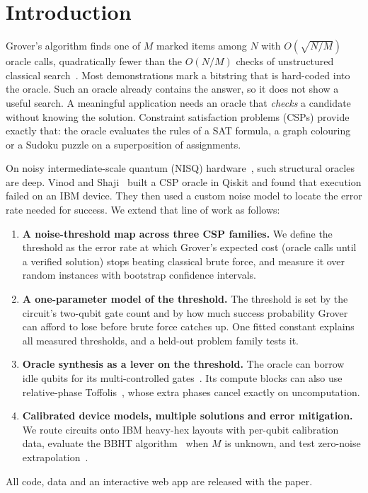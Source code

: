 \documentclass[conference]{IEEEtran}
\begin{document}
\section{Introduction}

Grover's algorithm finds one of $M$ marked items among $N$ with $O(\sqrt{N/M})$ oracle calls, quadratically fewer than the $O(N/M)$ checks of unstructured classical search~\cite{grover1996,bbht1998}. Most demonstrations mark a bitstring that is hard-coded into the oracle. Such an oracle already contains the answer, so it does not show a useful search. A meaningful application needs an oracle that \emph{checks} a candidate without knowing the solution. Constraint satisfaction problems (CSPs) provide exactly that: the oracle evaluates the rules of a SAT formula, a graph colouring or a Sudoku puzzle on a superposition of assignments.

On noisy intermediate-scale quantum (NISQ) hardware~\cite{preskill2018}, such structural oracles are deep. Vinod and Shaji~\cite{vinod2021} built a CSP oracle in Qiskit and found that execution failed on an IBM device. They then used a custom noise model to locate the error rate needed for success. We extend that line of work as follows:
\begin{enumerate}
\item \textbf{A noise-threshold map across three CSP families.} We define the threshold as the error rate at which Grover's expected cost (oracle calls until a verified solution) stops beating classical brute force, and measure it over random instances with bootstrap confidence intervals.
\item \textbf{A one-parameter model of the threshold.} The threshold is set by the circuit's two-qubit gate count and by how much success probability Grover can afford to lose before brute force catches up. One fitted constant explains all measured thresholds, and a held-out problem family tests it.
\item \textbf{Oracle synthesis as a lever on the threshold.} The oracle can borrow idle qubits for its multi-controlled gates~\cite{khattar2025}. Its compute blocks can also use relative-phase Toffolis~\cite{maslov2016}, whose extra phases cancel exactly on uncomputation.
\item \textbf{Calibrated device models, multiple solutions and error mitigation.} We route circuits onto IBM heavy-hex layouts with per-qubit calibration data, evaluate the BBHT algorithm~\cite{bbht1998} when $M$ is unknown, and test zero-noise extrapolation~\cite{temme2017,giurgica2020}.
\end{enumerate}
All code, data and an interactive web app are released with the paper.
\end{document}
